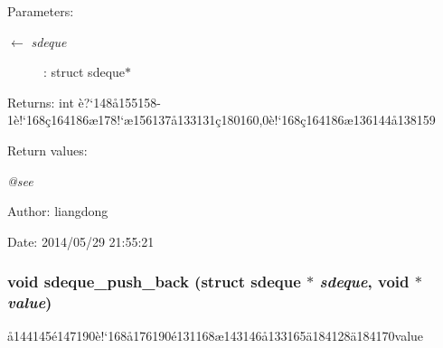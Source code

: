 \begin{Desc}
\item[Parameters:]
\begin{description}
\item[\mbox{$\leftarrow$} {\em sdeque}]: struct sdeque$\ast$ \end{description}
\end{Desc}
\begin{Desc}
\item[Returns:]int \`{e}?`148\aa{}155158-1\`{e}!`168\c{c}164186\ae{}178!`\ae{}156137\aa{}133131\c{c}180160,0\`{e}!`168\c{c}164186\ae{}136144\aa{}138159 \end{Desc}
\begin{Desc}
\item[Return values:]
\begin{description}
\item[{\em @see}]\end{description}
\end{Desc}
\begin{Desc}
\item[Author:]liangdong \end{Desc}
\begin{Desc}
\item[Date:]2014/05/29 21:55:21 \end{Desc}
\subsubsection{\setlength{\rightskip}{0pt plus 5cm}void sdeque\_\-push\_\-back (struct sdeque $\ast$ {\em sdeque}, void $\ast$ {\em value})}\label{sdeque_8c_a5}


\aa{}144145\'{e}147190\`{e}!`168\aa{}176190\'{e}131168\ae{}143146\aa{}133165\"{a}184128\"{a}184170value 

